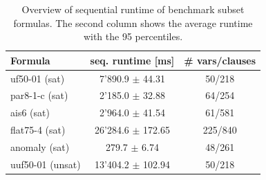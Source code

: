 \documentclass[letterpaper]{article}
\begin{document}
\begin{table}[h]
    \centering
    \begin{tabular}{|l|c|c|}
        \hline
        Formula & seq. runtime [ms] & \# vars/clauses \\
        \hline
        \hline
        uf50-01 (sat) & 7'890.9 $\pm$ 44.31 & 50/218\\
        \hline
        par8-1-c (sat) & 2'185.0 $\pm$ 32.88 & 64/254\\
        \hline
        ais6 (sat) &  2'964.0 $\pm$ 41.54 & 61/581\\
        \hline
        flat75-4 (sat) & 26'284.6 $\pm$ 172.65 & 225/840\\
        \hline
        anomaly (sat) & 279.7 $\pm$ 6.74 & 48/261\\
        \hline
        uuf50-01 (unsat) & 13'404.2 $\pm$ 102.94 & 50/218\\
        \hline
    \end{tabular}
    \caption{Overview of sequential runtime of benchmark subset formulas.
    The second column shows the average runtime with the 95 percentiles.}
    \label{tab:cnfs_representatives}
\end{table}
\end{document}
